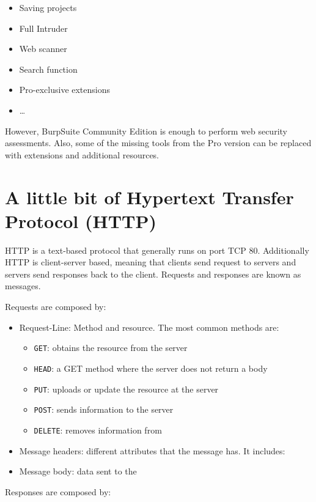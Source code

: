 \documentclass[twocolumn]{article}
\begin{document}
\begin{itemize}
    \item Saving projects
    \item Full Intruder
    \item Web scanner
    \item Search function
    \item Pro-exclusive extensions
    \item \dots
\end{itemize}

However, BurpSuite Community Edition is enough to perform web security assessments. Also, some of the missing tools from the Pro version can be replaced with extensions and additional resources.

\section{A little bit of Hypertext Transfer Protocol (HTTP)}

HTTP\cite{rfc2616} is a text-based protocol that generally runs on port TCP 80. Additionally HTTP is client-server based, meaning that clients send request to servers and servers send responses back to the client. Requests and responses are known as messages.

Requests are composed by:

\begin{itemize}
    \item Request-Line: Method and resource. The most common methods are:  
    \begin{itemize}
        \item \texttt{GET}: obtains the resource from the server
        \item \texttt{HEAD}: a GET method where the server does not return a body
        \item \texttt{PUT}: uploads or update the resource at the server
        \item \texttt{POST}: sends information to the server
        \item \texttt{DELETE}: removes information from
    \end{itemize}
    \item Message headers: different attributes that the message has. It includes:
    \item Message body: data sent to the 
\end{itemize}

Responses are composed by:
\end{document}
